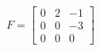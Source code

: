 \documentclass[preview]{standalone}
\begin{document}
\begin{align*}
F = \begin{bmatrix} 0 & 2 & -1 \\ 0 & 0 & -3 \\ 0 & 0 & 0 \end{bmatrix}
\end{align*}
\end{document}
